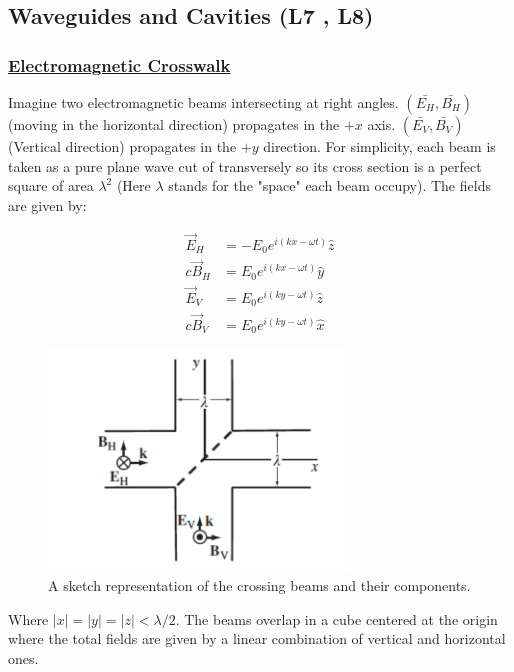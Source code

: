 \subsection{Waveguides and Cavities \textbf{(L7 , L8)}}

 \subsubsection{\hyperref[Electromagnetic Crosswalk]{Electromagnetic Crosswalk}}
 
Imagine two electromagnetic beams intersecting at right angles. $(\bar{E_{H}},\bar{B_{H}})$ (moving in the horizontal direction) propagates in the $+x$ axis. $(\bar{E_{V}},\bar{B_{V}})$ (Vertical direction) propagates in the $+y$ direction. For simplicity, each beam is taken as a pure plane wave cut of transversely so its cross section is a perfect square of area $\lambda^{2}$ (Here $\lambda$ stands for the "space" each beam occupy). The fields are given by:
	
\begin{subequations}
\begin{align}
\vec{E}_{H} &= -E_{0} e^{i(kx - \omega t)} \hat{z}\\
c \vec{B}_{H} &= E_{0} e^{i(kx - \omega t)} \hat{y}\\
\vec{E}_{V} &= E_{0} e^{i(ky - \omega t)} \hat{z}\\
c \vec{B}_{V} &= E_{0} e^{i(ky - \omega t)} \hat{x}
\end{align}
\end{subequations}

\begin{figure}[h]
	\includegraphics[width=8cm]{figures/crossbeams.png}
	\centering
	\caption{A sketch representation of the crossing beams and their components.}
\end{figure}

Where $\left|x\right|=\left|y\right|=\left|z\right|< \lambda/2$. The beams overlap in a cube centered at the origin where the total fields are given by a linear combination of vertical and horizontal ones.

